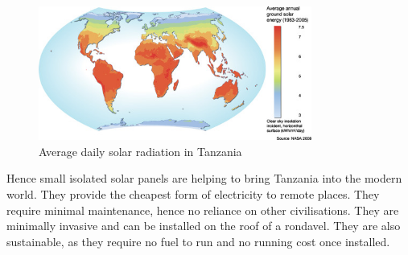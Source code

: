 \begin{figure}[!ht]
\includegraphics[width=0.8\textwidth]{IMG/pvp.jpg}
\caption{Average daily solar radiation in Tanzania \cite{Aly2017Dec}}
\label{fig:4_Review_2}
\end{figure}

Hence small isolated solar panels are helping to bring Tanzania into the modern world. They provide the cheapest form of electricity to remote places. They require minimal maintenance, hence no reliance on other civilisations. They are minimally invasive and can be installed on the roof of a rondavel. They are also sustainable, as they require no fuel to run and no running cost once installed.
